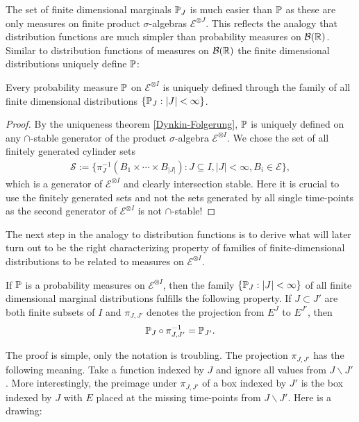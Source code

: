 The set of finite dimensional marginals $\P_J$ is much easier than $\P$ as these are only measures on finite product $\sigma$-algebras $\mathcal E^{\otimes J}$. This reflects  the analogy that distribution functions are much simpler than probability measures on $\mathcal B(\R)$. Similar to distribution functions of measures on $\mathcal B(\R)$ the finite dimensional distributions uniquely define $\P$:
\begin{llemma}\label{lemma:unique}
\begin{prop}
	Every probability measure $\P$ on $\mathcal E^{\otimes I}$ is uniquely defined through the family of all finite dimensional distributions $\{\P_J:|J|<\infty\}$.
\end{prop}
\end{llemma}
\begin{proof}[Proof]
	By the uniqueness theorem \ref{Dynkin-Folgerung}, $\P$ is uniquely defined on any $\cap$-stable generator of the product $\sigma$-algebra $\mathcal E^{\otimes I}$. We chose the set of all finitely generated cylinder sets
	\begin{align*}
		\mathcal S:=\{\pi_J^{-1}(B_1\times \cdots \times B_{|J|}):J \subseteq I, |J|<\infty, B_i\in  \mathcal E\},
	\end{align*}
	which is a generator of $\mathcal E^{\otimes I}$ and clearly intersection stable. Here it is crucial to use the finitely generated sets and not the sets generated by all single time-points as the second generator of $\mathcal E^{\otimes I}$ is not $\cap$-stable!
\end{proof}
The next step in the analogy to distribution functions is to derive what will later turn out to be the right characterizing property of families of finite-dimensional distributions to be related to measures on $\mathcal E^{\otimes I}$. 
\begin{llemma}
	\begin{prop}
	If $\P$ is a probability measures on $\mathcal E^{\otimes I}$, then the family $\{\P_J:|J|<\infty\}$ of all finite dimensional marginal distributions fulfills the following property. If $J\subset J'$ are both finite subsets of $I$ and $\pi_{J,J'}$ denotes the projection from $E^J$ to $E^{J'}$, then
		\begin{align*}
			\P_J \circ \pi^{-1}_{J,J'}=\P_{J'}.
		\end{align*}
	\end{prop}
\end{llemma}
The proof is simple, only the notation is troubling. The projection $\pi_{J,J'}$ has the following meaning. Take a function indexed by $J$ and ignore all values from $J\backslash J'$. More interestingly, the preimage under $\pi_{J,J'}$ of a box indexed by $J'$ is the box indexed by $J$ with $E$ placed at the missing time-points from $J\backslash J'$. Here is a drawing: 

